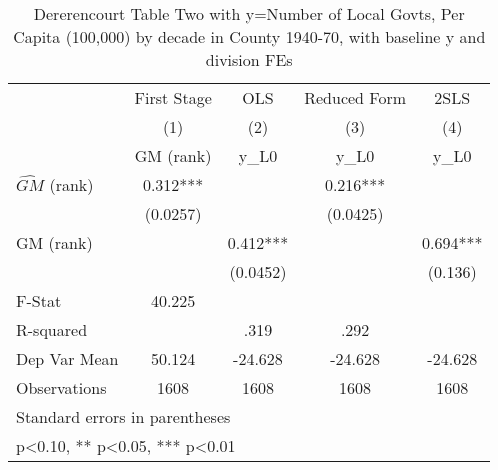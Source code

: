 \begin{table}[htbp]\centering
\def\sym#1{\ifmmode^{#1}\else\(^{#1}\)\fi}
\caption{Dererencourt Table Two with y=Number of Local Govts, Per Capita (100,000) by decade in County 1940-70, with baseline y and division FEs}
\begin{tabular}{l*{4}{c}}
\toprule
                    & First Stage   &         OLS   &Reduced Form   &        2SLS   \\
                    &\multicolumn{1}{c}{(1)}&\multicolumn{1}{c}{(2)}&\multicolumn{1}{c}{(3)}&\multicolumn{1}{c}{(4)}\\
                    &\multicolumn{1}{c}{GM  (rank)}&\multicolumn{1}{c}{y\_L0}&\multicolumn{1}{c}{y\_L0}&\multicolumn{1}{c}{y\_L0}\\
\midrule
$\hat{GM}$ (rank)   &       0.312***&               &       0.216***&               \\
                    &    (0.0257)   &               &    (0.0425)   &               \\
\addlinespace
GM  (rank)          &               &       0.412***&               &       0.694***\\
                    &               &    (0.0452)   &               &     (0.136)   \\
\midrule
F-Stat              &      40.225   &               &               &               \\
R-squared           &               &        .319   &        .292   &               \\
Dep Var Mean        &      50.124   &     -24.628   &     -24.628   &     -24.628   \\
Observations        &        1608   &        1608   &        1608   &        1608   \\
\bottomrule
\multicolumn{5}{l}{\footnotesize Standard errors in parentheses}\\
\multicolumn{5}{l}{\footnotesize * p<0.10, ** p<0.05, *** p<0.01}\\
\end{tabular}
\end{table}
